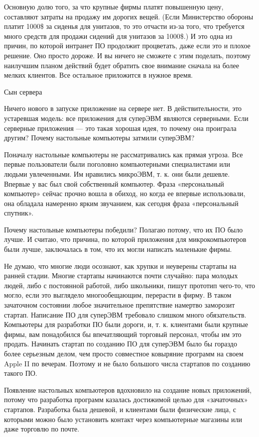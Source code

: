 \documentclass[ebook,12pt,oneside,openany]{memoir}
\begin{document}
Основную долю того, за что крупные фирмы платят повышенную цену,
составляют затраты на продажу им дорогих вещей. (Если Министерство
обороны платит 1000\$ за сиденья для унитазов, то это отчасти из-за
того, что требуется много средств для продажи сидений для унитазов за
1000\$.) И это одна из причин, по которой интранет ПО продолжит
процветать, даже если это и плохое решение. Оно просто дороже. И вы
ничего не сможете с этим поделать, поэтому наилучшим планом действий
будет обратить свое внимание сначала на более мелких клиентов. Все
остальное приложится в нужное время.

Сын сервера

Ничего нового в запуске приложение на сервере нет. В действительности,
это устаревшая модель: все приложения для суперЭВМ являются
серверными. Если серверные приложения — это такая хорошая идея, то
почему она проиграла другим? Почему настольные компьютеры затмили
суперЭВМ?

Поначалу настольные компьютеры не рассматривались как прямая угроза.
Все первые пользователи были поголовно компьютерными специалистами или
людьми увлеченными. Им нравились микроЭВМ, т. к. они были дешевле.
Впервые у вас был свой собственный компьютер. Фраза «персональный
компьютер» сейчас прочно вошла в обиход, но когда ее впервые
использовали, она обладала намеренно ярким звучанием, как сегодня
фраза «персональный спутник».

Почему настольные компьютеры победили? Полагаю потому, что их ПО было
лучше. И считаю, что причина, по которой приложения для
микрокомпьютеров были лучше, заключалась в том, что их могли написать
маленькие фирмы.

Не думаю, что многие люди осознают, как хрупки и неуверены стартапы на
ранней стадии. Многие стартапы начинаются почти случайно: пара молодых
людей, либо с постоянной работой, либо школьники, пишут прототип
чего-то, что могло, если это выглядело многообещающим, перерасти в
фирму. В таком зачаточном состоянии любое значительное препятствие
намертво заморозит стартап. Написание ПО для суперЭВМ требовало
слишком много обязательств. Компьютеры для разработки ПО были дороги,
и, т. к. клиентами были крупные фирмы, вам понадобился бы впечатляющий
торговый персонал, чтобы им это продать. Начинать стартап по созданию
ПО для суперЭВМ было бы гораздо более серьезным делом, чем просто
совместное ковыряние программ на своем Apple II по вечерам. Поэтому и
не было большого числа стартапов по созданию такого ПО.

Появление настольных компьютеров вдохновило на создание новых
приложений, потому что разработка программ казалась достижимой целью
для «зачаточных» стартапов. Разработка была дешевой, и клиентами были
физические лица, с которыми можно было установить контакт через
компьютерные магазины или даже торговлю по почте.
\end{document}
